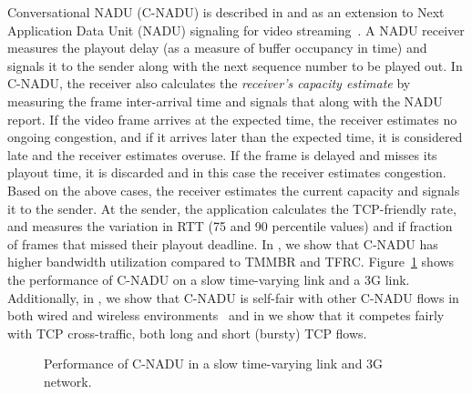 Conversational NADU (C-NADU) is described in  and
 as an extension to Next Application Data Unit (NADU)
signaling for video streaming~\cite{nadu.1070341,nadu.1530486}. A NADU
receiver measures the playout delay (as a measure of buffer occupancy in time)
and signals it to the sender along with the next sequence number to be played
out. In C-NADU, the receiver also calculates the \emph{receiver's capacity
estimate} by measuring the frame inter-arrival time and signals that along
with the NADU report. If the video frame arrives at the expected time, the
receiver estimates no ongoing congestion, and if it arrives later than the
expected time, it is considered late and the receiver estimates overuse. If
the frame is delayed and misses its playout time, it is discarded and in this
case the receiver estimates congestion. Based on the above cases, the receiver
estimates the current capacity and signals it to the sender. At the sender,
the application calculates the TCP-friendly rate, and measures the variation
in RTT (75 and 90 percentile values) and if fraction of frames that missed
their playout deadline. In , we show that C-NADU has higher
bandwidth utilization compared to TMMBR and TFRC. Figure~\ref{fig:cnadu} shows
the performance of C-NADU on a slow time-varying link and a 3G link.
Additionally, in , we show that C-NADU is self-fair with
other C-NADU flows in both wired and wireless
environments~\cite{singh:2010:thesis} and in  we show that it
competes fairly with TCP cross-traffic, both long and short (bursty) TCP
flows.

\begin{figure}
  \centerline{
  }
  \caption{Performance of C-NADU in a slow time-varying link and 3G network.}
  \label{fig:cnadu}
\end{figure}

